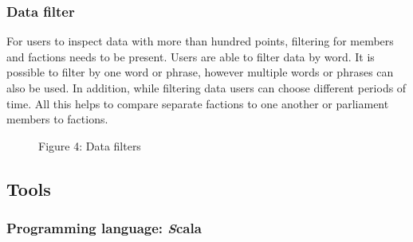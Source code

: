 \documentclass[a4paper,12pt]{article}
\begin{document}
	\subsubsection{Data filter}
	
	For users to inspect data with more than hundred points, filtering for members and factions needs to be present. Users are able to filter data by word. It is possible to filter by one word or phrase, however multiple words or phrases can also be used. In addition, while filtering data users can choose different periods of time. All this helps to compare separate factions to one another or parliament members to factions.
	
	\clearpage
	
	\begin{figure}[!tbp]
		\centering
		\hfill
		\hfill
		\caption{Figure 4: Data filters}
	\end{figure}
	
	\clearpage

  	\subsection{Tools}
    \subsubsection{Programming language: {\textit Scala}}
    
\end{document}
